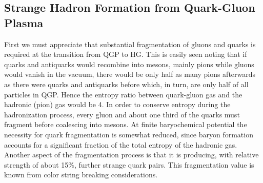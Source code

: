 \begin{mdframed}[linecolor=gray,roundcorner=12pt,backgroundcolor=Dandelion!15,linewidth=1pt,leftmargin=0cm,rightmargin=0cm,topline=true,bottomline=true,skipabove=12pt]
\section*{Strange Hadron Formation from Quark-Gluon Plasma}
First we must appreciate that substantial fragmentation of gluons and quarks is required at the transition from QGP to HG. This is easily seen noting that if quarks and antiquarks would recombine into mesons, mainly pions while gluons would vanish in the vacuum, there would be only half as many pions afterwards as there were quarks and antiquarks before which, in turn, are only half of all particles in QGP. Hence the entropy ratio between quark-gluon gas and the hadronic (pion) gas would be 4. In order to conserve entropy during the hadronization process, every gluon and about one third of the quarks must fragment before coalescing into mesons. At finite baryochemical potential the necessity for quark fragmentation is somewhat reduced, since baryon formation accounts for a significant fraction of the total entropy of the hadronic gas. Another aspect of the fragmentation process is that it is producing, with relative strength of about 15\%, further strange quark pairs. This fragmentation value is known from color string breaking considerations.


\end{mdframed}

